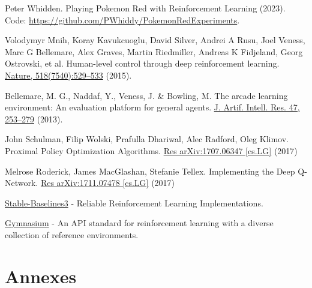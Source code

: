 \documentclass[10pt,conference]{IEEEtran}
\begin{document}
\begin{thebibliography}{1}

Peter Whidden. Playing Pokemon Red with Reinforcement Learning (2023).
Code: \url{https://github.com/PWhiddy/PokemonRedExperiments}.

Volodymyr Mnih, Koray Kavukcuoglu, David Silver, Andrei A Rusu, Joel Veness, Marc G Bellemare,
Alex Graves, Martin Riedmiller, Andreas K Fidjeland, Georg Ostrovski, et al. 
Human-level control through deep reinforcement learning. \href{https://www.nature.com/articles/nature14236}{Nature, 518(7540):529–533} (2015).

Bellemare, M. G., Naddaf, Y., Veness, J. \& Bowling, M.
The arcade learning environment: An evaluation platform for general agents. \href{https://jair.org/index.php/jair/article/view/10819}{J. Artif. Intell. Res. 47, 253–279} (2013). 

John Schulman, Filip Wolski, Prafulla Dhariwal, Alec Radford, Oleg Klimov.
Proximal Policy Optimization Algorithms. \href{https://arxiv.org/abs/1707.06347}{Res arXiv:1707.06347 [cs.LG]} (2017)

Melrose Roderick, James MacGlashan, Stefanie Tellex.
Implementing the Deep Q-Network. \href{https://arxiv.org/abs/1711.07478}{Res arXiv:1711.07478 [cs.LG]} (2017)

\href{https://stable-baselines3.readthedocs.io}{Stable-Baselines3} - Reliable Reinforcement Learning Implementations.

\href{https://gymnasium.farama.org}{Gymnasium} - An API standard for reinforcement learning with a diverse collection of reference environments.

\end{thebibliography}





\section{Annexes}

\end{document}
